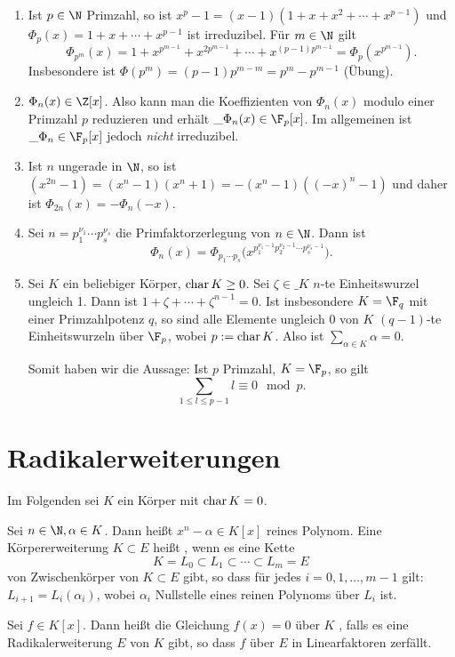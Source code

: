 \begin{ex} \label{20.1-11}
	\begin{enumerate}[1)]
		\item
			Ist $p \in \N$ Primzahl, so ist $x^p - 1 = (x-1)(1 + x + x^2 + \dotsb + x^{p-1})$ und $\Phi_p(x) = 1 + x + \dotsb + x^{p-1}$ ist irreduzibel.
			Für $m \in \N$ gilt
			\[
				\Phi_{p^m}(x) = 1 + x^{p^{m-1}} + x^{2p^{m-1}} + \dotsb + x^{(p-1)p^{m-1}} = \Phi_p(x^{p^{m-1}}).
			\]
			Insbesondere ist $\Phi(p^m) = (p-1)p^{m-m} = p^m - p^{m-1}$ (Übung).
		\item
			$\Phi_n(x) \in \Z[x]$.
			Also kann man die Koeffizienten von $\Phi_n(x)$ modulo einer Primzahl $p$ reduzieren und erhält $\_{\Phi_n(x)} \in \F_p[x]$.
			Im allgemeinen ist $\_{\Phi_n} \in \F_p[x]$ jedoch \emph{nicht} irreduzibel.
		\item
			Ist $n$ ungerade in $\N$, so ist $(x^{2n} - 1) = (x^n - 1)(x^n + 1) = -(x^n-1)((-x)^n-1)$ und daher ist $\Phi_{2n}(x) = - \Phi_n(-x)$.
		\item
			Sei $n = p_1^{\nu_1} \dotsb p_s^{\nu_s}$ die Primfaktorzerlegung von $n \in \N$.
			Dann ist
			\[
				\Phi_n(x) = \Phi_{p_1\dotsb p_s} \Big( x^{p_1^{\nu_1 -1 }p_2^{\nu_2 - 1} \dotsb p_s^{\nu_s - 1}} \Big).
			\]
		\item
			Sei $K$ ein beliebiger Körper, $\operatorname{char} K \ge 0$.
			Sei $\zeta \in \_K$ $n$-te Einheitswurzel ungleich 1.
			Dann ist $1 + \zeta + \dotsb + \zeta^{n-1} = 0$.
			Ist insbesondere $K = \F_q$ mit einer Primzahlpotenz $q$, so sind alle Elemente ungleich 0 von $K$ $(q-1)$-te Einheitswurzeln über $\F_p$, wobei $p := \operatorname{char} K$.
			Also ist $\sum_{\alpha \in K} \alpha = 0$.

			Somit haben wir die Aussage:
			Ist $p$ Primzahl, $K = \F_p$, so gilt
			\[
				\sum_{1 \le l \le p-1} l \equiv 0 \mod p.
			\]
	\end{enumerate}
\end{ex}

\section{Radikalerweiterungen}

Im Folgenden sei $K$ ein Körper mit $\operatorname{char} K = 0$.

\begin{df}
	Sei $n \in \N, \alpha \in K$.
	Dann heißt $x^n - \alpha \in K[x]$ reines Polynom.
	Eine Körpererweiterung $K \subset E$ heißt , wenn es eine Kette
	\[
		K = L_0 \subset L_1 \subset \dotsb \subset L_m = E
	\]
	von Zwischenkörper von $K \subset E$ gibt, so dass für jedes $i = 0, 1, \dotsc, m-1$ gilt: $L_{i+1} = L_i(\alpha_i)$, wobei $\alpha_i$ Nullstelle eines reinen Polynoms über $L_i$ ist.

	Sei $f \in K[x]$.
	Dann heißt die Gleichung $f(x) = 0$ über $K$ , falls es eine Radikalerweiterung $E$ von $K$ gibt, so dass $f$ über $E$ in Linearfaktoren zerfällt.
\end{df}


